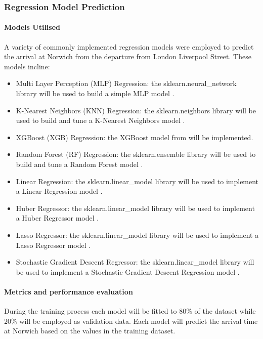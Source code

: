 \subsubsection{Regression Model Prediction}
\paragraph{Models Utilised}
A variety of commonly implemented regression models were employed to predict the arrival at Norwich from the departure from London Liverpool Street. These models incline:
\begin{itemize}
    \item Multi Layer Perception (MLP) Regression: the sklearn.neural\_network library will be used to build a simple MLP model \citep{scikit-learn}.
    \item K-Nearest Neighbors (KNN) Regression: the sklearn.neighbors library will be used to build and tune a K-Nearest Neighbors model \citep{scikit-learn}.
    \item XGBoost (XGB) Regression: the XGBoost model from \cite{chen2016xgboost} will be implemented.
    \item Random Forest (RF) Regression: the sklearn.ensemble library will be used to build and tune a Random Forest model \citep{scikit-learn}.
    \item Linear Regression: the sklearn.linear\_model library will be used to implement a Linear Regression model \citep{scikit-learn}.
    \item Huber Regressor: the sklearn.linear\_model library will be used to implement a Huber Regressor model \citep{scikit-learn}.
    \item Lasso Regressor: the sklearn.linear\_model library will be used to implement a Lasso Regressor model \citep{scikit-learn}.
    \item Stochastic Gradient Descent Regressor: the sklearn.linear\_model library will be used to implement a Stochastic Gradient Descent Regression model \citep{scikit-learn}.
\end{itemize}

\paragraph{Metrics and performance evaluation}\label{Sec: Regression Metrics & performance}
During the training process each model will be fitted to 80\% of the dataset while 20\% will be employed as validation data. Each model will predict the arrival time at Norwich based on the values in the training dataset.

